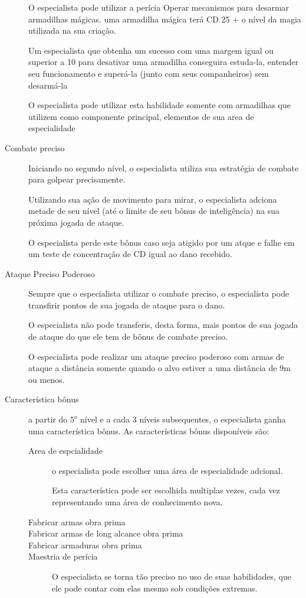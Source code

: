 \begin{description}
O especialista pode utilizar a per\'icia Operar mecanismos para
desarmar armadilhas m\'agicas.
uma armadilha m\'agica ter\'a CD 25 + o n\'ivel da magia utilizada
na sua cria\c{c}\~ao.

Um especialista que obtenha um sucesso com uma margem igual ou superior
a 10 para desativar uma armadilha conseguira estuda-la, entender
seu funcionamento e super\'a-la (junto com seus companheiros) sem desarm\'a-la

O especialista pode utilizar esta habilidade somente com armadilhas
que utilizem como componente principal, elementos de sua area de especialidade

\item[Combate preciso]
Iniciando no segundo n\'ivel, o especialista utiliza sua estrat\'egia de
combate para golpear precisamente.

Utilizando sua a\c{c}\~ao de movimento para mirar, o especialista adciona
metade de seu n\'ivel (at\'e o limite de seu b\^onus de intelig\^encia)
na sua pr\'oxima jogada de ataque.

O especialista perde este b\^onus caso seja atigido por um atque e
falhe em um teste de concentra\c{c}\~ao de CD igual ao dano recebido.

\item[Ataque Preciso Poderoso]
Sempre que o especialista utilizar o combate preciso, o especialista
pode transfirir pontos de sua jogada de ataque para o dano.

O especialista n\~ao pode transferis, desta forma, mais pontos
de sua jogada de ataque do que ele tem de b\^onus de combate preciso.

O especialista pode realizar um ataque preciso poderoso com armas
de ataque a dist\^ancia somente quando o alvo estiver a uma dist\^ancia
de 9m ou menos.

\item[Caracter\'istica b\^onus] a partir do \(5^o\) n\'ivel e a cada
3 n\'iveis subsequentes, o especialista ganha uma caracter\'istica b\^onus.
As caracter\'isticas b\^onus dispon\'iveis s\~ao:

\begin{description}
\item[Area de espcialidade] o especialista pode escolher uma \'area de especialidade
adcional.

Esta caracter\'istica pode ser escolhida multiplas vezes, cada vez representando uma
\'area de conhecimento nova.

\item[Fabricar armas obra prima]
\item[Fabricar armas de long alcance obra prima]
\item[Fabricar armaduras obra prima]
\item[Maestria de per\'icia] O especialista se torna t\~ao preciso
no uso de suas habilidades, que ele pode contar com elas
mesmo sob condi\c{c}\~oes extremas.


\end{description}
\end{description}
